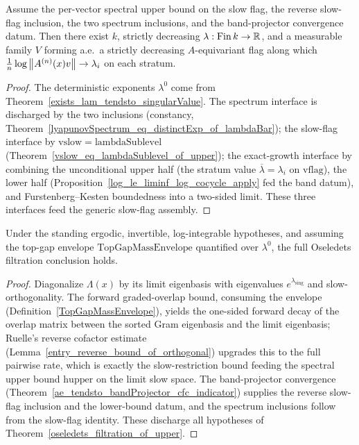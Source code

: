 \begin{theorem}\label{oseledets_filtration_of_upper}
  \leanok
  Assume the per-vector spectral upper bound on the slow flag, the reverse slow-flag inclusion, the
  two spectrum inclusions, and the band-projector convergence datum. Then there exist
  \(k\), strictly decreasing \(\lambda:\mathrm{Fin}\,k\to\mathbb{R}\), and a measurable family
  \(V\) forming a.e.\ a strictly decreasing \(A\)-equivariant flag along which
  \(\tfrac1n\log\left\lVert A^{(n)}(x)v \right\rVert\to\lambda_i\) on each stratum.
\end{theorem}
\begin{proof}\leanok
  The deterministic exponents \(\lambda^0\) come from
  Theorem~\ref{exists_lam_tendsto_singularValue}. The spectrum interface is discharged by the two
  inclusions (constancy, Theorem~\ref{lyapunovSpectrum_eq_distinctExp_of_lambdaBar}); the slow-flag
  interface by \(\mathrm{vslow}=\mathrm{lambdaSublevel}\)
  (Theorem~\ref{vslow_eq_lambdaSublevel_of_upper}); the exact-growth interface by combining the
  unconditional upper half (the stratum value \(\overline\lambda=\lambda_i\) on
  \(\mathrm{vflag}\)), the lower half (Proposition~\ref{log_le_liminf_log_cocycle_apply} fed the
  band datum), and Furstenberg--Kesten boundedness into a two-sided limit. These three interfaces
  feed the generic slow-flag assembly.
\end{proof}

\begin{theorem}\label{oseledets_filtration_of_topgap}
  \leanok
  Under the standing ergodic, invertible, log-integrable hypotheses, and assuming the top-gap
  envelope \(\mathrm{TopGapMassEnvelope}\) quantified over \(\lambda^0\), the full Oseledets
  filtration conclusion holds.
\end{theorem}
\begin{proof}\leanok
  Diagonalize \(\Lambda(x)\) by its limit eigenbasis with eigenvalues \(e^{\lambda_{\mathrm{sing}}}\)
  and slow-orthogonality. The forward graded-overlap bound, consuming the envelope
  (Definition~\ref{TopGapMassEnvelope}), yields the one-sided forward decay of the overlap matrix
  between the sorted Gram eigenbasis and the limit eigenbasis; Ruelle's reverse cofactor estimate
  (Lemma~\ref{entry_reverse_bound_of_orthogonal}) upgrades this to the full pairwise rate, which is
  exactly the slow-restriction bound feeding the spectral upper bound \(\mathrm{hupper}\) on the
  limit slow space. The band-projector convergence
  (Theorem~\ref{ae_tendsto_bandProjector_cfc_indicator}) supplies the reverse slow-flag inclusion
  and the lower-bound datum, and the spectrum inclusions follow from the slow-flag identity. These
  discharge all hypotheses of Theorem~\ref{oseledets_filtration_of_upper}.
\end{proof}

